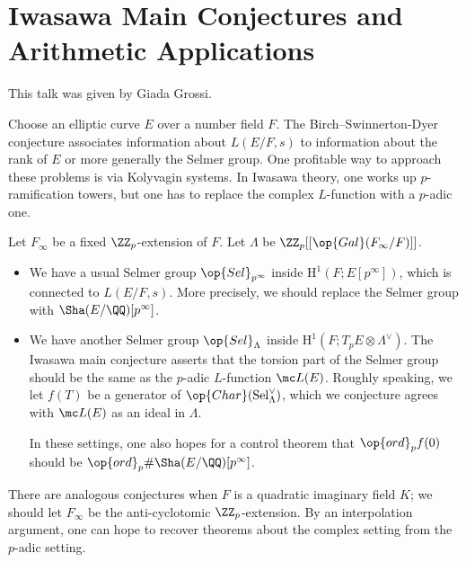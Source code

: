 \documentclass{article}
\begin{document}
\section{Iwasawa Main Conjectures and Arithmetic Applications}
This talk was given by Giada Grossi.

Choose an elliptic curve $E$ over a number field $F$. The Birch--Swinnerton-Dyer conjecture associates information about $L(E/F,s)$ to information about the rank of $E$ or more generally the Selmer group. One profitable way to approach these problems is via Kolyvagin systems. In Iwasawa theory, one works up $p$-ramification towers, but one has to replace the complex $L$-function with a $p$-adic one.

Let $F_\infty$ be a fixed $\ZZ_p$-extension of $F$. Let $\Lambda$ be $\ZZ_p[[\op{Gal}(F_\infty/F)]]$.
\begin{itemize}
	\item We have a usual Selmer group $\op{Sel}_{p^\infty}$ inside $\mathrm H^1(F;E[p^\infty])$, which is connected to $L(E/F,s)$. More precisely, we should replace the Selmer group with $\Sha(E/\QQ)[p^\infty]$.

	\item We have another Selmer group $\op{Sel}_\Lambda$ inside $\mathrm H^1(F;T_pE\otimes\Lambda^\lor)$. The Iwasawa main conjecture asserts that the torsion part of the Selmer group should be the same as the $p$-adic $L$-function $\mc L(E)$. Roughly speaking, we let $f(T)$ be a generator of $\op{Char}(\mathrm{Sel}_\Lambda^\lor)$, which we conjecture agrees with $\mc L(E)$ as an ideal in $\Lambda$.

	In these settings, one also hopes for a control theorem that $\op{ord}_pf(0)$ should be $\op{ord}_p\#\Sha(E/\QQ)[p^\infty]$.
\end{itemize}
There are analogous conjectures when $F$ is a quadratic imaginary field $K$; we should let $F_\infty$ be the anti-cyclotomic $\ZZ_p$-extension. By an interpolation argument, one can hope to recover theorems about the complex setting from the $p$-adic setting.
\end{document}
